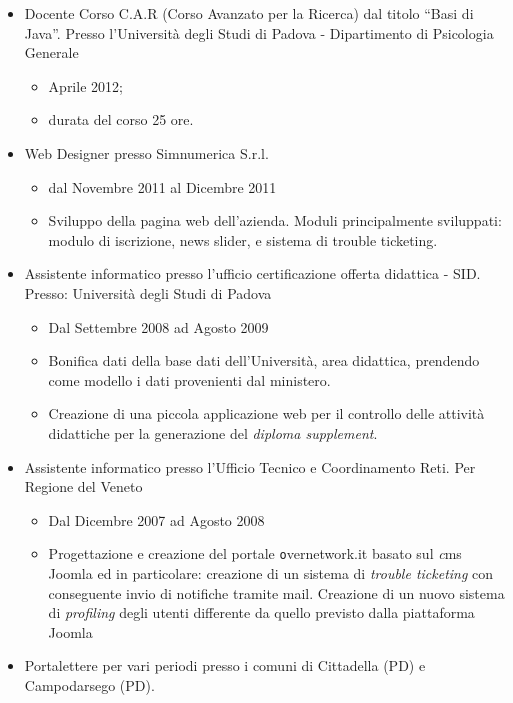 \documentclass[pdftex,a4paper,10pt,twoside,titlepage,italian,openright]{article}
\begin{document}
\begin{itemize}
	\item Docente Corso C.A.R (Corso Avanzato per la Ricerca) dal titolo ``Basi di Java''.
	Presso l'Università degli Studi di Padova - Dipartimento di Psicologia Generale
	\begin{itemize}
		\item Aprile 2012;
		\item durata del corso 25 ore.
	\end{itemize}
	\item Web Designer presso Simnumerica S.r.l.
	\begin{itemize}
		\item dal Novembre 2011 al Dicembre 2011
		\item Sviluppo della pagina web dell'azienda. Moduli principalmente sviluppati: modulo di 
		iscrizione, news slider, e sistema di trouble ticketing.
	\end{itemize}
	\item Assistente informatico presso l'ufficio certificazione offerta didattica - SID.
	Presso: Università degli Studi di Padova
	\begin{itemize}
		\item Dal Settembre 2008 ad Agosto 2009 
		\item Bonifica dati della base dati dell'Università, area didattica, prendendo come 
		modello i dati provenienti dal ministero.
		\item Creazione di una piccola applicazione web per il controllo delle attività didattiche
		per la generazione del \textit{diploma supplement}.
	\end{itemize}
	\item Assistente informatico presso l'Ufficio Tecnico e Coordinamento Reti. Per
	Regione del Veneto
	\begin{itemize}
		\item Dal Dicembre 2007 ad Agosto 2008
		\item Progettazione e creazione del portale {\texttt overnetwork.it} basato sul {\textit cms Joomla}
		ed in particolare: creazione di un sistema di \textit{trouble ticketing} con conseguente 
		invio di notifiche tramite mail. Creazione di un nuovo sistema di \textit{profiling}
		degli utenti differente da quello previsto dalla piattaforma Joomla
	\end{itemize}
	\item Portalettere per vari periodi presso i comuni di Cittadella (PD) e Campodarsego (PD).
\end{itemize}
\end{document}
